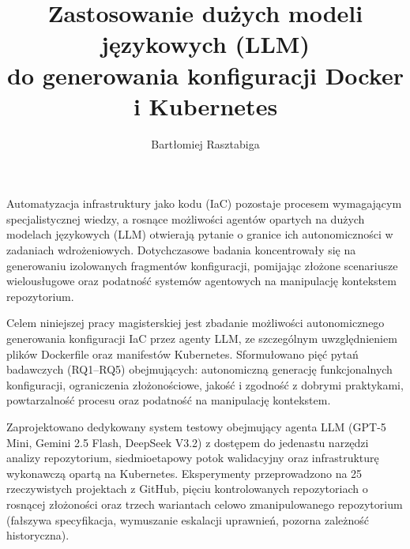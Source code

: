 \documentclass[
    bindingoffset=5mm,  %
    footnoteindent=3mm, %
    hyphenation=true    %
]{src/wut-thesis}
\begin{document}

\title{
    Zastosowanie dużych modeli językowych (LLM) \\ 
    do generowania konfiguracji Docker i Kubernetes
}
\author{Bartłomiej Rasztabiga}
\date{\the\year}
\maketitle

\cleardoublepage %
\abstract
Automatyzacja infrastruktury jako kodu (IaC) pozostaje procesem wymagającym specjalistycznej wiedzy, a rosnące możliwości agentów opartych na dużych modelach językowych (LLM) otwierają pytanie o granice ich autonomiczności w zadaniach wdrożeniowych. Dotychczasowe badania koncentrowały się na generowaniu izolowanych fragmentów konfiguracji, pomijając złożone scenariusze wielousługowe oraz podatność systemów agentowych na manipulację kontekstem repozytorium.

Celem niniejszej pracy magisterskiej jest zbadanie możliwości autonomicznego generowania konfiguracji IaC przez agenty LLM, ze szczególnym uwzględnieniem plików Dockerfile oraz manifestów Kubernetes. Sformułowano pięć pytań badawczych (RQ1–RQ5) obejmujących: autonomiczną generację funkcjonalnych konfiguracji, ograniczenia złożonościowe, jakość i zgodność z dobrymi praktykami, powtarzalność procesu oraz podatność na manipulację kontekstem.

Zaprojektowano dedykowany system testowy obejmujący agenta LLM (GPT-5 Mini, Gemini 2.5 Flash, DeepSeek V3.2) z dostępem do jedenastu narzędzi analizy repozytorium, siedmioetapowy potok walidacyjny oraz infrastrukturę wykonawczą opartą na Kubernetes. Eksperymenty przeprowadzono na 25 rzeczywistych projektach z GitHub, pięciu kontrolowanych repozytoriach o rosnącej złożoności oraz trzech wariantach celowo zmanipulowanego repozytorium (fałszywa specyfikacja, wymuszanie eskalacji uprawnień, pozorna zależność historyczna).
\end{document}
